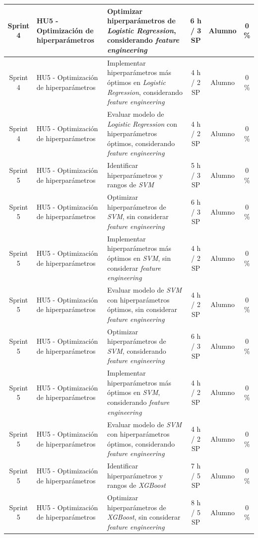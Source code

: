 \documentclass[
11pt, %
]{charter}
\begin{document}
\begin{xltabular}{\linewidth}{@{}|c|X|X|c|c|c|@{}}
Sprint 4 & HU5 - Optimización de hiperparámetros & Optimizar hiperparámetros de \textit{Logistic Regression}, considerando \textit{feature engineering}  & 6 h / 3 SP & Alumno & 0 \% \\ \hline
Sprint 4 & HU5 - Optimización de hiperparámetros & Implementar hiperparámetros más óptimos en \textit{Logistic Regression}, considerando \textit{feature engineering}  & 4 h / 2 SP & Alumno & 0 \% \\ \hline
Sprint 4 & HU5 - Optimización de hiperparámetros & Evaluar modelo de \textit{Logistic Regression} con hiperparámetros óptimos, considerando \textit{feature engineering}  & 4 h / 2 SP & Alumno & 0 \% \\ \hline
Sprint 5 & HU5 - Optimización de hiperparámetros & Identificar hiperparámetros y rangos de \textit{SVM}  & 5 h / 3 SP & Alumno & 0 \% \\ \hline
Sprint 5 & HU5 - Optimización de hiperparámetros & Optimizar hiperparámetros de \textit{SVM}, sin considerar \textit{feature engineering}  & 6 h / 3 SP & Alumno & 0 \% \\ \hline
Sprint 5 & HU5 - Optimización de hiperparámetros & Implementar hiperparámetros más óptimos en \textit{SVM}, sin considerar \textit{feature engineering}  & 4 h / 2 SP & Alumno & 0 \% \\ \hline
Sprint 5 & HU5 - Optimización de hiperparámetros & Evaluar modelo de \textit{SVM} con hiperparámetros óptimos, sin considerar \textit{feature engineering}  & 4 h / 2 SP & Alumno & 0 \% \\ \hline
Sprint 5 & HU5 - Optimización de hiperparámetros & Optimizar hiperparámetros de \textit{SVM}, considerando \textit{feature engineering}  & 6 h / 3 SP & Alumno & 0 \% \\ \hline
Sprint 5 & HU5 - Optimización de hiperparámetros & Implementar hiperparámetros más óptimos en \textit{SVM}, considerando \textit{feature engineering}  & 4 h / 2 SP & Alumno & 0 \% \\ \hline
Sprint 5 & HU5 - Optimización de hiperparámetros & Evaluar modelo de \textit{SVM} con hiperparámetros óptimos, considerando \textit{feature engineering}  & 4 h / 2 SP & Alumno & 0 \% \\ \hline
Sprint 5 & HU5 - Optimización de hiperparámetros & Identificar hiperparámetros y rangos de \textit{XGBoost}  & 7 h / 5 SP & Alumno & 0 \% \\ \hline
Sprint 5 & HU5 - Optimización de hiperparámetros & Optimizar hiperparámetros de \textit{XGBoost}, sin considerar \textit{feature engineering}  & 8 h / 5 SP & Alumno & 0 \%\\ \hline

\end{xltabular}
\end{document}
